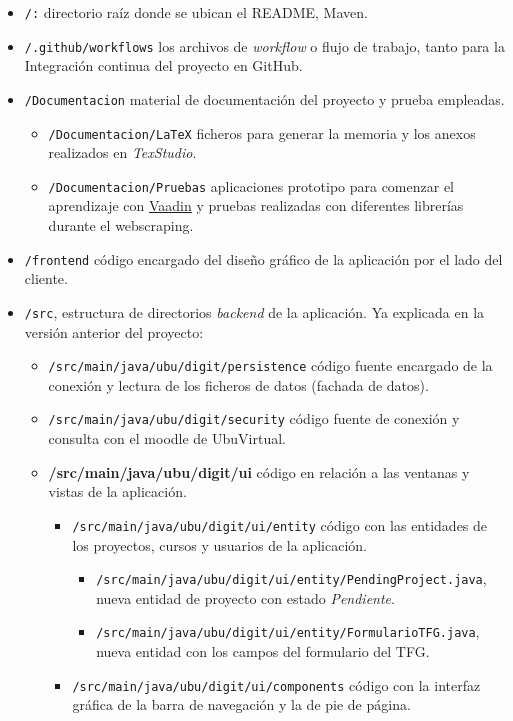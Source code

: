 \begin{itemize}
	\item \texttt{/:} directorio raíz donde se ubican el README, Maven. 
	\item \texttt{/.github/workflows} los archivos de \textit{workflow} o flujo de trabajo, tanto para la Integración continua del proyecto en GitHub.
	\item \texttt{/Documentacion} material de documentación del proyecto y prueba empleadas.
	\begin{itemize}
		\tightlist
		\item \texttt{/Documentacion/LaTeX} ficheros para generar la memoria y los anexos realizados en \emph{TexStudio}.
		\item \texttt{/Documentacion/Pruebas} aplicaciones prototipo para comenzar el aprendizaje con \href{https://vaadin.com/}{Vaadin} y pruebas realizadas con diferentes librerías durante el webscraping.
	\end{itemize}
	\item \texttt{/frontend} código encargado del diseño gráfico de la aplicación por el lado del cliente.
	\item \texttt{/src}, estructura de directorios \emph{backend} de la aplicación. Ya explicada en la versión anterior del proyecto:
		\begin{itemize}
			\item \texttt{/src/main/java/ubu/digit/persistence} código fuente encargado de la conexión y lectura de los ficheros de datos (fachada de datos).		
			\item \texttt{/src/main/java/ubu/digit/security} código fuente de conexión y consulta con el moodle de UbuVirtual.
			\item \textbf{/src/main/java/ubu/digit/ui} código en relación a las ventanas y vistas de la aplicación.
			\begin{itemize}
				\item \texttt{/src/main/java/ubu/digit/ui/entity} código con las entidades de los proyectos, cursos y usuarios de la aplicación.
					\begin{itemize}
						\item \texttt{/src/main/java/ubu/digit/ui/entity/PendingProject.java}, nueva entidad de proyecto con estado \emph{Pendiente}.
						\item \texttt{/src/main/java/ubu/digit/ui/entity/FormularioTFG.java}, nueva entidad con los campos del formulario del TFG.
					\end{itemize}
				\item \texttt{/src/main/java/ubu/digit/ui/components} código con la interfaz gráfica de la barra de navegación y la de pie de página.

\end{itemize}
\end{itemize}
\end{itemize}

